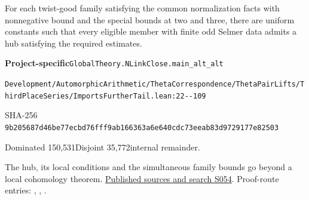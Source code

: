 
\begin{formalstatement}[D421]\label{decomp:D421}
For each twist-good family satisfying the common normalization facts with nonnegative bound and the special bounds at two and three, there are uniform constants such that every eligible member with finite odd Selmer data admits a hub satisfying the required estimates.
\end{formalstatement}
{\small\raggedright\noindent\textsf{\bfseries Project-specific}\quad \nolinkurl{GlobalTheory.NLinkClose.main_alt_alt}\par\noindent \nolinkurl{Development/AutomorphicArithmetic/ThetaCorrespondence/ThetaPairLifts/ThirdPlaceSeries/ImportsFurtherTail.lean:22--109}\par\noindent SHA-256 \nolinkurl{9b205687d46be77ecbd76fff9ab166363a6e640cdc73eeab83d9729177e82503}\par\noindent Dominated 150,531\quad Disjoint 35,772\quad internal remainder.\par}
The hub, its local conditions and the simultaneous family bounds go beyond a local cohomology theorem.
\hyperref[lit:S054]{Published sources and search S054}.
Proof-route entries: , , .
